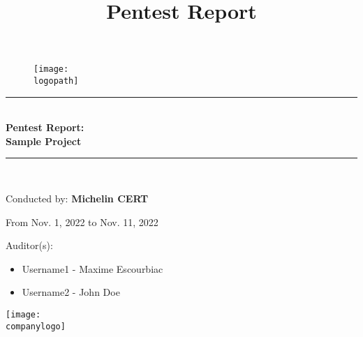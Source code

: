 \documentclass[12pt, table,dvipsnames]{article}
\newcommand{\doctitle}{Pentest Report}
\newcommand{\client}{Sample Project}
\newcommand{\teamname}{Michelin CERT}
\newcommand{\classification}{CONFIDENTIAL}
\newcommand{\logopath}{resources/logo.png}
\newcommand{\companylogo}{resources/companylogo.png}
\newcommand{\HRule}{\rule{\linewidth}{0.5mm}}
\begin{document}
\title{\doctitle}

\begin{titlepage}
	\begin{center}
		
		\vspace{0.25cm}
		\begin{figure}[H]
			\centering
			\texttt{[image: \\logopath]}
		\end{figure}
		
		\HRule\\[0.2cm]
		{\huge\bfseries\doctitle : \\ \client}
		\HRule\\[0.5cm]
		\vfill
		
		\Large{Conducted by:}
		\LARGE{\textbf{\teamname}}
		\vfill
		
		\Large{From Nov. 1, 2022 to Nov. 11, 2022}
		\vfill
		
		Auditor(s):
		\begin{center}
			\small{
			\begin{itemize}
				\centering
				\item[] Username1 - Maxime Escourbiac
				\item[] Username2 - John Doe
			\end{itemize}
			}
		\end{center}
		\vfill
		
		\texttt{[image: \\companylogo]}
				
		{\footnotesize {\color{red}{\classification}}}
		
	\end{center}
\end{titlepage}

\renewcommand{\contentsname}{Table of Contents}
\tableofcontents\thispagestyle{fancy}
\newpage
\end{document}
